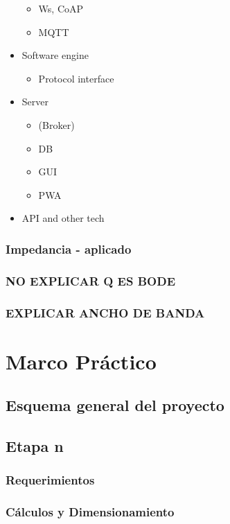 \begin{itemize}
\begin{itemize}
\item Ws, CoAP
\item MQTT
\end{itemize}
\item Software engine
\begin{itemize}
\item Protocol interface
\end{itemize}
\item Server
\begin{itemize}
\item (Broker)
\item DB
\item GUI
\item PWA
\end{itemize}
\item API and other tech
\end{itemize}

\subsection{Impedancia - aplicado}
\label{sec:org5572965}
\subsection{NO EXPLICAR Q ES BODE}
\label{sec:org88838dc}
\subsection{EXPLICAR ANCHO DE BANDA}
\label{sec:orge4ac79c}
\chapter{Marco Pr\'actico}
\section{Esquema general del proyecto}
\label{sec:orga5c9b8f}
\section{Etapa n}
\label{sec:org9d127d2}
\subsection{Requerimientos}
\label{sec:org0ca573e}
\subsection{Cálculos y Dimensionamiento}
\label{sec:org70d3a4b}
